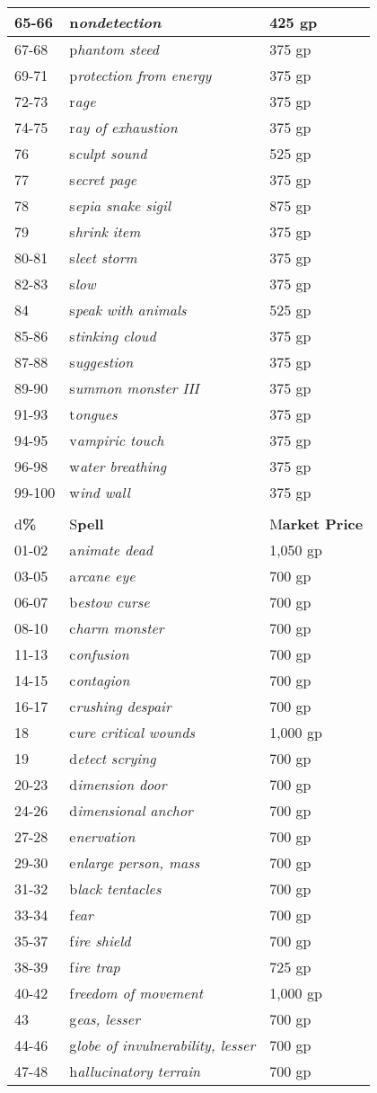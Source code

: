 \documentclass{article}
\begin{document}
\begin{tabular}{|>{\raggedright}p{28pt}|>{\raggedright}p{200pt}|>{\raggedright}p{85pt}|}
65-66 & n\textit{ondetection} & 425 gp\tabularnewline
\hline
67-68 & p\textit{hantom steed} & 375 gp\tabularnewline
\hline
69-71 & p\textit{rotection from energy} & 375 gp\tabularnewline
\hline
72-73 & r\textit{age} & 375 gp\tabularnewline
\hline
74-75 & r\textit{ay of exhaustion} & 375 gp\tabularnewline
\hline
76 & s\textit{culpt sound} & 525 gp\tabularnewline
\hline
77 & s\textit{ecret page} & 375 gp\tabularnewline
\hline
78 & s\textit{epia snake sigil} & 875 gp\tabularnewline
\hline
79 & s\textit{hrink item} & 375 gp\tabularnewline
\hline
80-81 & s\textit{leet storm} & 375 gp\tabularnewline
\hline
82-83 & s\textit{low} & 375 gp\tabularnewline
\hline
84 & s\textit{peak with animals} & 525 gp\tabularnewline
\hline
85-86 & s\textit{tinking cloud} & 375 gp\tabularnewline
\hline
87-88 & s\textit{uggestion} & 375 gp\tabularnewline
\hline
89-90 & s\textit{ummon monster III} & 375 gp\tabularnewline
\hline
91-93 & t\textit{ongues} & 375 gp\tabularnewline
\hline
94-95 & v\textit{ampiric touch} & 375 gp\tabularnewline
\hline
96-98 & w\textit{ater breathing} & 375 gp\tabularnewline
\hline
99-100 & w\textit{ind wall} & 375 gp\tabularnewline
\hline
\multicolumn{3}{|p{314pt}|}{4\textit{\textbf{th-Level Arcane Spells}}}\tabularnewline
\hline
d\textbf{\%} & S\textbf{pell} & M\textbf{arket Price}\tabularnewline
\hline
01-02 & a\textit{nimate dead} & 1,050 gp\tabularnewline
\hline
03-05 & a\textit{rcane eye} & 700 gp\tabularnewline
\hline
06-07 & b\textit{estow curse} & 700 gp\tabularnewline
\hline
08-10 & c\textit{harm monster} & 700 gp\tabularnewline
\hline
11-13 & c\textit{onfusion} & 700 gp\tabularnewline
\hline
14-15 & c\textit{ontagion} & 700 gp\tabularnewline
\hline
16-17 & c\textit{rushing despair} & 700 gp\tabularnewline
\hline
18 & c\textit{ure critical wounds} & 1,000 gp\tabularnewline
\hline
19 & d\textit{etect scrying} & 700 gp\tabularnewline
\hline
20-23 & d\textit{imension door} & 700 gp\tabularnewline
\hline
24-26 & d\textit{imensional anchor} & 700 gp\tabularnewline
\hline
27-28 & e\textit{nervation} & 700 gp\tabularnewline
\hline
29-30 & e\textit{nlarge person, mass} & 700 gp\tabularnewline
\hline
31-32 & b\textit{lack tentacles} & 700 gp\tabularnewline
\hline
33-34 & f\textit{ear} & 700 gp\tabularnewline
\hline
35-37 & f\textit{ire shield} & 700 gp\tabularnewline
\hline
38-39 & f\textit{ire trap} & 725 gp\tabularnewline
\hline
40-42 & f\textit{reedom of movement} & 1,000 gp\tabularnewline
\hline
43 & g\textit{eas, lesser} & 700 gp\tabularnewline
\hline
44-46 & g\textit{lobe of invulnerability, lesser} & 700 gp\tabularnewline
\hline
47-48 & h\textit{allucinatory terrain} & 700 gp\tabularnewline

\end{tabular}
\end{document}
